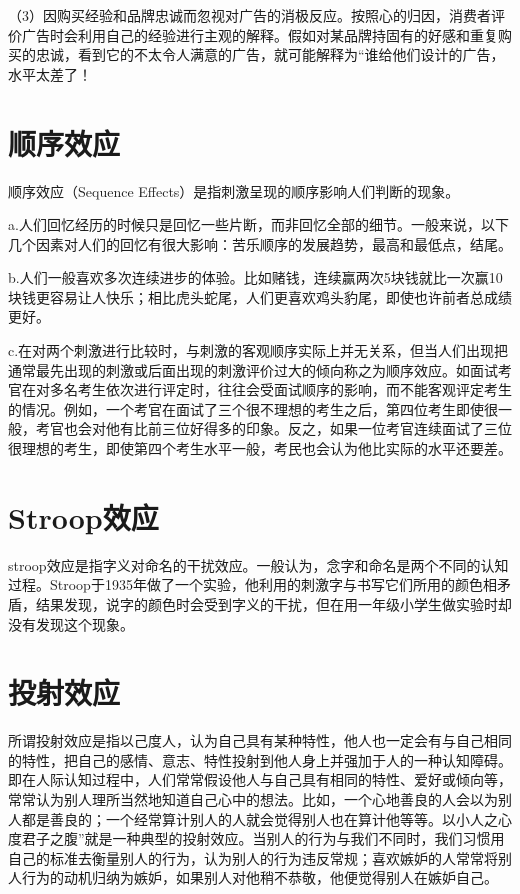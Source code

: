 \documentclass[11pt]{ctexart}
\begin{document}
（3）因购买经验和品牌忠诚而忽视对广告的消极反应。按照心的归因，消费者评价广告时会利用自己的经验进行主观的解释。假如对某品牌持固有的好感和重复购买的忠诚，看到它的不太令人满意的广告，就可能解释为“谁给他们设计的广告，水平太差了！
\section{顺序效应}
\label{sec-91}


顺序效应（Sequence Effects）是指刺激呈现的顺序影响人们判断的现象。

a.人们回忆经历的时候只是回忆一些片断，而非回忆全部的细节。一般来说，以下几个因素对人们的回忆有很大影响：苦乐顺序的发展趋势，最高和最低点，结尾。

b.人们一般喜欢多次连续进步的体验。比如赌钱，连续赢两次5块钱就比一次赢10块钱更容易让人快乐；相比虎头蛇尾，人们更喜欢鸡头豹尾，即使也许前者总成绩更好。

c.在对两个刺激进行比较时，与刺激的客观顺序实际上并无关系，但当人们出现把通常最先出现的刺激或后面出现的刺激评价过大的倾向称之为顺序效应。如面试考官在对多名考生依次进行评定时，往往会受面试顺序的影响，而不能客观评定考生的情况。例如，一个考官在面试了三个很不理想的考生之后，第四位考生即使很一般，考官也会对他有比前三位好得多的印象。反之，如果一位考官连续面试了三位很理想的考生，即使第四个考生水平一般，考民也会认为他比实际的水平还要差。
\section{Stroop效应}
\label{sec-92}


stroop效应是指字义对命名的干扰效应。一般认为，念字和命名是两个不同的认知过程。Stroop于1935年做了一个实验，他利用的刺激字与书写它们所用的颜色相矛盾，结果发现，说字的颜色时会受到字义的干扰，但在用一年级小学生做实验时却没有发现这个现象。
\section{投射效应}
\label{sec-93}


所谓投射效应是指以己度人，认为自己具有某种特性，他人也一定会有与自己相同的特性，把自己的感情、意志、特性投射到他人身上并强加于人的一种认知障碍。即在人际认知过程中，人们常常假设他人与自己具有相同的特性、爱好或倾向等，常常认为别人理所当然地知道自己心中的想法。比如，一个心地善良的人会以为别人都是善良的；一个经常算计别人的人就会觉得别人也在算计他等等。以小人之心度君子之腹”就是一种典型的投射效应。当别人的行为与我们不同时，我们习惯用自己的标准去衡量别人的行为，认为别人的行为违反常规；喜欢嫉妒的人常常将别人行为的动机归纳为嫉妒，如果别人对他稍不恭敬，他便觉得别人在嫉妒自己。
\end{document}
